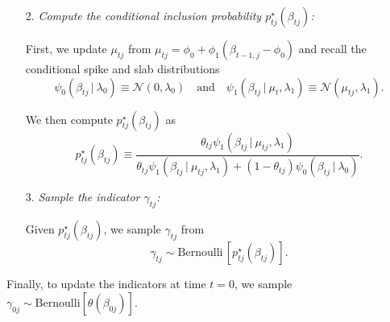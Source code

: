 \documentclass[ba]{imsart}
\numberwithin{equation}{section}
\theoremstyle{plain}
\def\C {\,|\:}
\def\C {\,|\:}
\begin{document}
{{\begin{itemize}
	We first recall the stationary spike and slab distributions
		\begin{equation*}
			\psi_0^{ST}(\beta \C \lambda_0)\equiv \mathcal{N}( 0,{\lambda_0})\quad\text{and}\quad
				\psi_1^{ST}(\beta \C \lambda_1,\phi_0,\phi_1)\equiv \mathcal{N}\left( \phi_0,\frac{\lambda_1}{1-\phi_1^2}\right).
		\end{equation*}
		Given $\Theta$, we then compute the mixing weight $\theta_{tj}$ as
		\begin{equation}\label{theta_for_MCMC}
			\theta_{tj}\equiv\theta(\beta_{t-1,j})=\frac{\Theta\psi_1^{ST}\left(\beta_{t-1,j}|\lambda_1,\phi_0,\phi_1\right)}{\Theta\psi_1^{ST}\left(\beta_{t-1,j}|\lambda_1,\phi_0,\phi_1\right)+(1-\Theta)\psi_0^{ST}\left(\beta_{t-1,j}|\lambda_0\right)}.
		\end{equation}

	\item[2.]{\em Compute the conditional inclusion probability $p^\star_{tj}(\beta_{tj})$:} 
 
	
        First, we update $\mu_{tj}$ from
	$	\mu_{tj}=\phi_{0}+\phi_{1}(\beta_{t-1,j}-\phi_0)$
	 and   recall the conditional spike and slab distributions
	\begin{equation*}
			\psi_0(\beta_{tj}\C  \lambda_0)\equiv \mathcal{N}(0,{\lambda_0})\quad\text{and}\quad
			\psi_1(\beta_{tj}\C \mu_t, \lambda_1)\equiv \mathcal{N}\left(\mu_{tj},\lambda_1\right).
		\end{equation*}
	
	We then compute $p^\star_{tj}(\beta_{tj})$  as
	\begin{equation}\label{pstar_first}
		p^\star_{tj}(\beta_{tj})\equiv\frac{\theta_{tj}  \psi_1(\beta_{tj}\C\mu_{tj},\lambda_1)}{\theta_{tj}  \psi_1(\beta_{tj}\C\mu_{tj},\lambda_1)+(1-\theta_{tj}) \psi_0(\beta_{tj}\C\lambda_0)}.
	\end{equation}
	
	\item[3.]{\em  Sample the indicator $\gamma_{tj}$:}
	
		Given $p^\star_{tj}(\beta_{tj})$, we  sample $\gamma_{tj}$ from 
		\begin{equation}\label{eq:sample_gamma}
		\gamma_{tj}\sim \mathrm{Bernoulli}\, [p^\star_{tj}(\beta_{tj})].
		\end{equation}
\end{itemize} 
Finally, to update the indicators at time $t=0$, we sample
$
\gamma_{0j}\sim \mathrm{Bernoulli}[ \theta(\beta_{0j})].
$


{
}}}
\end{document}

